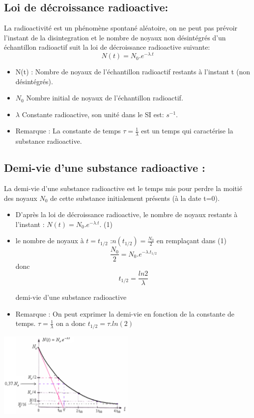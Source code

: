 \documentclass[12pt]{article}
\begin{document}
\subsection{Loi de décroissance radioactive:}
La radioactivité est un phénomène spontané aléatoire, on ne peut pas prévoir l'instant de la disintegration et le nombre de
noyaux non désintégrés d'un échantillon radioactif suit la loi de décroissance radioactive suivante: $$N(t) = N_0.e^{-\lambda.t}$$

\begin{itemize}
	\item N(t) : Nombre de noyaux de l'échantillon radioactif restants à l'instant t (non désintégrés). 

	\item $N_0$ Nombre initial de noyaux de l'échantillon radioactif. 

	\item $\lambda$  Constante radioactive, son unité dans le SI est: $s^{-1}$.
	\item Remarque : La constante de temps $\tau = \frac{1}{\lambda}$ est un temps qui caractérise la substance radioactive.
\end{itemize}

\subsection{Demi-vie d'une substance radioactive : }
La demi-vie d'une substance radioactive est le temps mis pour perdre la moitié des noyaux $N_0$ de cette substance initialement présents (à la date t=0).

\begin{itemize}
	\item D'après la loi de décroissance radioactive, le nombre de noyaux restants à l'instant : $N(t) = N_0.e^{-\lambda.t}$. (1)

	\item le nombre de noyaux à $t=t_{1/2}$ :$n(t_{1/2})=\frac{N_0}{2}$ en remplaçant dans (1) $$\frac{N_0}{2} = N_0.e^{-\lambda.t_{1/2}}$$ donc$$t_{1/2} = \frac{ln2}{\lambda}$$
		
		demi-vie d'une substance radioactive

	\item 	Remarque : On peut exprimer la demi-vie en fonction de la constante de temps. 
		$\tau = \frac{1}{\lambda}$ on a donc $t_{1/2} = \tau.ln(2)$

\end{itemize}
\begin{center}

	\includegraphics[width=0.5\textwidth]{./img/nuc08.png}
\end{center}
\end{document}
